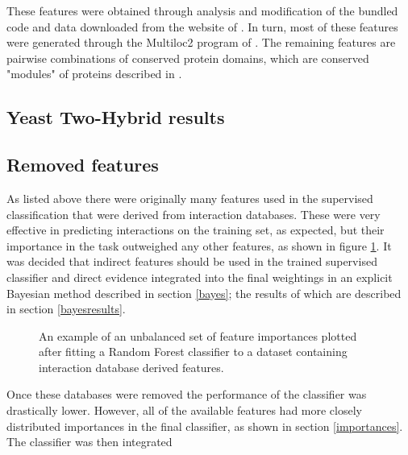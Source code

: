 These features were obtained through analysis and modification of the bundled code and data downloaded from the website of \textcite{rodgers-melnick_predicting_2013}.
In turn, most of these features were generated through the Multiloc2 program of \textcite{blum_multiloc2:_2009}.
The remaining features are pairwise combinations of conserved protein domains, which are conserved "modules" of proteins described in \textcite{janin_domains_1985}.

\subsection{Yeast Two-Hybrid results}
\label{y2h}


\subsection{Removed features}

As listed above there were originally many features used in the supervised classification that were derived from interaction databases.
These were very effective in predicting interactions on the training set, as expected, but their importance in the task outweighed any other features, as shown in figure \ref{fig:unbalanced}.
It was decided that indirect features should be used in the trained supervised classifier and direct evidence integrated into the final weightings in an explicit Bayesian method described in section \ref{bayes}; the results of which are described in section \ref{bayesresults}.

\begin{figure}
    \centering
    \setlength\figureheight{3in}
    \setlength\figurewidth{4in}
    \caption{An example of an unbalanced set of feature importances plotted after fitting a Random Forest classifier to a dataset containing interaction database derived features.}
    \label{fig:unbalanced}
\end{figure}

Once these databases were removed the performance of the classifier was drastically lower.
However, all of the available features had more closely distributed importances in the final classifier, as shown in section \ref{importances}.
The classifier was then integrated 

